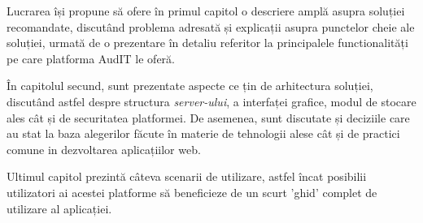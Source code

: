 Lucrarea își propune să ofere în primul capitol o descriere amplă asupra soluției recomandate, discutând problema adresată și explicații asupra punctelor cheie ale soluției, urmată de o prezentare în detaliu referitor la principalele functionalități pe care platforma AudIT le oferă.
\par În capitolul secund, sunt prezentate aspecte ce țin de arhitectura soluției, discutând astfel despre structura \textit{server-ului}, a interfaței grafice, modul de stocare ales cât și de securitatea platformei. De asemenea, sunt discutate și deciziile care au stat la baza alegerilor făcute în materie de tehnologii alese cât și de practici comune in dezvoltarea aplicațiilor  web.
\par  Ultimul capitol prezintă câteva scenarii de utilizare, astfel încat posibilii utilizatori ai acestei platforme să beneficieze de un scurt 'ghid' complet  de utilizare al aplicației.


   

